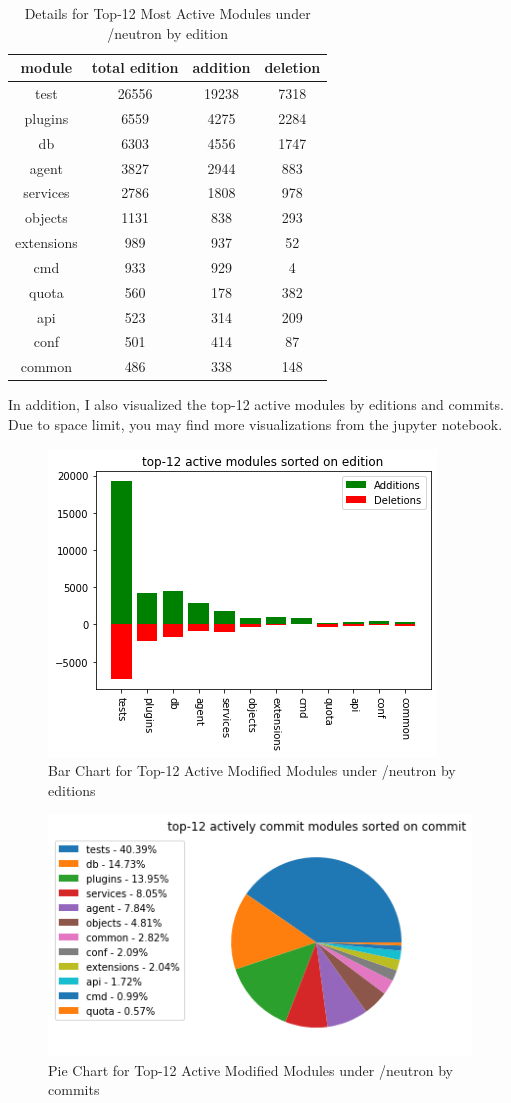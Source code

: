 \documentclass[11pt]{article}
\begin{document}
\begin{table}[H]
    \centering
    \begin{tabular}{|c||c|c|c|}
         \hline
         module & total edition & addition & deletion\\
         \hline
         test & 26556 & 19238 & 7318\\
         plugins & 6559 & 4275 & 2284\\
         db & 6303 & 4556 & 1747\\
         agent & 3827 & 2944 & 883\\
         services & 2786 & 1808 & 978\\
         objects & 1131 & 838 & 293\\
         extensions & 989 & 937 & 52\\
         cmd & 933 & 929 & 4\\
         quota & 560 & 178 & 382\\
         api & 523 & 314 & 209\\
         conf & 501 & 414 & 87\\
         common & 486 & 338 & 148\\
         \hline
    \end{tabular}
    \caption{Details for Top-12 Most Active Modules under /neutron by edition}
    \label{tab:1}
\end{table}
In addition, I also visualized the top-12 active modules by editions and commits. Due to space limit, you may find more visualizations from the jupyter notebook.
\begin{figure}[H]
    \centering
    \includegraphics[width=0.5\linewidth]{./img/sorted_by_edition/top-12_active_modules_sorted_on_edition_bar.png}
    \caption{Bar Chart for Top-12 Active Modified Modules under /neutron by editions}
    \label{fig:1}
\end{figure}
\begin{figure}[H]
    \centering
    \includegraphics[width=0.5\linewidth]{./img/sorted_by_commit/top-12_actively_commit_modules_sorted_on_commit_pie.png}
    \caption{Pie Chart for Top-12 Active Modified Modules under /neutron by commits}
    \label{fig:2}
\end{figure}
\end{document}
